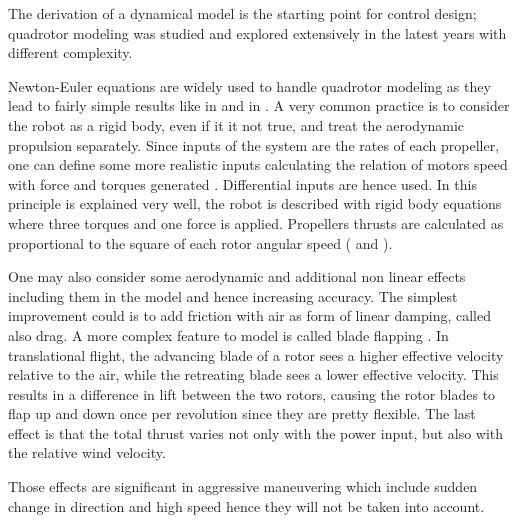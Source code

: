 The derivation of a dynamical model is the starting point for control design; quadrotor modeling was studied and explored extensively in the latest years with different complexity.\par Newton-Euler equations are widely used to handle quadrotor modeling as they lead to fairly simple results like in \cite{Michael2014}  and in \cite{Vendittelli}. A very common practice is to consider the robot as a rigid body, even if it it not true, and treat the aerodynamic propulsion separately. Since inputs of the system are the rates of each propeller, one can define some more realistic inputs calculating the relation of motors speed with force and torques generated \cite{Luukkonen2011}. Differential inputs are hence used. In \cite{Mahony2012} this principle is explained very well, the robot is described with rigid body equations where three torques and one force is applied. Propellers thrusts are calculated as proportional to the square of each rotor angular speed (\cite{Bouabdallah2007} and \cite{Mahony2012}). \par One may also consider some aerodynamic and additional non linear effects including them in the model and hence increasing accuracy. The simplest improvement could is to add friction with air as form of linear damping, called also drag. A more complex feature to model is called blade flapping \cite{Mahony2012}. In translational flight, the advancing blade of a rotor sees a higher effective velocity relative to the air, while the retreating blade sees a lower effective velocity. This results in a difference in lift between the two rotors, causing the rotor blades to flap up and down once per revolution \cite{Hoffmann2007} since they are pretty flexible. The last effect is that the total thrust varies not only with the power input, but also with the relative wind velocity.  \par Those effects are significant in aggressive maneuvering which include sudden change in direction and high speed hence they will not be taken into account. \\

